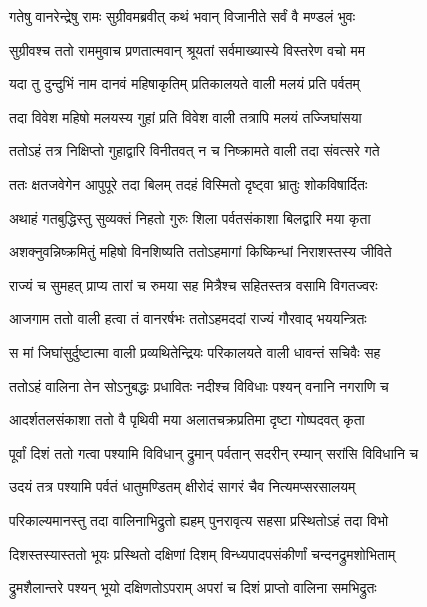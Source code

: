 
\twolineshloka
{गतेषु वानरेन्द्रेषु रामः सुग्रीवमब्रवीत्}
{कथं भवान् विजानीते सर्वं वै मण्डलं भुवः} %

\twolineshloka
{सुग्रीवश्च ततो राममुवाच प्रणतात्मवान्}
{श्रूयतां सर्वमाख्यास्ये विस्तरेण वचो मम} %

\twolineshloka
{यदा तु दुन्दुभिं नाम दानवं महिषाकृतिम्}
{प्रतिकालयते वाली मलयं प्रति पर्वतम्} %

\twolineshloka
{तदा विवेश महिषो मलयस्य गुहां प्रति}
{विवेश वाली तत्रापि मलयं तज्जिघांसया} %

\twolineshloka
{ततोऽहं तत्र निक्षिप्तो गुहाद्वारि विनीतवत्}
{न च निष्क्रामते वाली तदा संवत्सरे गते} %

\twolineshloka
{ततः क्षतजवेगेन आपुपूरे तदा बिलम्}
{तदहं विस्मितो दृष्ट्वा भ्रातुः शोकविषार्दितः} %

\twolineshloka
{अथाहं गतबुद्धिस्तु सुव्यक्तं निहतो गुरुः}
{शिला पर्वतसंकाशा बिलद्वारि मया कृता} %

\twolineshloka
{अशक्नुवन्निष्क्रमितुं महिषो विनशिष्यति}
{ततोऽहमागां किष्किन्धां निराशस्तस्य जीविते} %

\twolineshloka
{राज्यं च सुमहत् प्राप्य तारां च रुमया सह}
{मित्रैश्च सहितस्तत्र वसामि विगतज्वरः} %

\twolineshloka
{आजगाम ततो वाली हत्वा तं वानरर्षभः}
{ततोऽहमददां राज्यं गौरवाद् भययन्त्रितः} %

\twolineshloka
{स मां जिघांसुर्दुष्टात्मा वाली प्रव्यथितेन्द्रियः}
{परिकालयते वाली धावन्तं सचिवैः सह} %

\twolineshloka
{ततोऽहं वालिना तेन सोऽनुबद्धः प्रधावितः}
{नदीश्च विविधाः पश्यन् वनानि नगराणि च} %

\twolineshloka
{आदर्शतलसंकाशा ततो वै पृथिवी मया}
{अलातचक्रप्रतिमा दृष्टा गोष्पदवत् कृता} %

\twolineshloka
{पूर्वां दिशं ततो गत्वा पश्यामि विविधान् द्रुमान्}
{पर्वतान् सदरीन् रम्यान् सरांसि विविधानि च} %

\twolineshloka
{उदयं तत्र पश्यामि पर्वतं धातुमण्डितम्}
{क्षीरोदं सागरं चैव नित्यमप्सरसालयम्} %

\twolineshloka
{परिकाल्यमानस्तु तदा वालिनाभिद्रुतो ह्यहम्}
{पुनरावृत्य सहसा प्रस्थितोऽहं तदा विभो} %

\twolineshloka
{दिशस्तस्यास्ततो भूयः प्रस्थितो दक्षिणां दिशम्}
{विन्ध्यपादपसंकीर्णां चन्दनद्रुमशोभिताम्} %

\twolineshloka
{द्रुमशैलान्तरे पश्यन् भूयो दक्षिणतोऽपराम्}
{अपरां च दिशं प्राप्तो वालिना समभिद्रुतः} %

